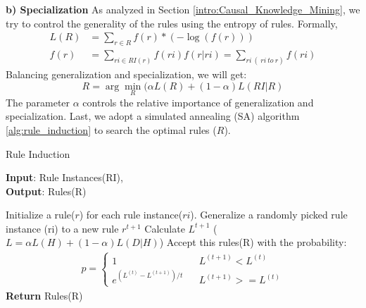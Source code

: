 \textbf{b) Specialization}
As analyzed in Section \ref{intro:Causal_Knowledge_Mining}, we try to control the generality of the rules using the entropy of rules. Formally,
\begin{equation*}
\begin{split}
L(R)&=\sum_{r \in R}{f(r)*(-\log(f(r)))}\\
f(r)&=\sum_{ri \in RI(r)}{f(ri)f(r|ri)}=\sum_{ri \ (\ ri\ to\ r)}f(ri)
\end{split}
\label{equ:mdl_2}
\end{equation*}
Balancing generalization and specialization, we will get:
$$R=\arg\min_{R}(\alpha L(R)+(1-\alpha)L(RI|R)\label{eq:objective_function}$$
The parameter $\alpha$ controls the relative importance of generalization and specialization.  
Last, we adopt a simulated annealing (SA) algorithm \ref{alg:rule_induction} to search the optimal rules ($R$). 
\begin{algorithm}[htb]
\caption{Rule Induction\label{alg:rule_induction}} 
\textbf{Input}: Rule Instances(RI), \zhpro \\
\textbf{Output}: Rules(R)
\begin{algorithmic}[1]
	\STATE Initialize a rule($r$) for each rule instance($ri$).
	\STATE	Generalize a randomly picked rule instance (ri) to a new rule $r^{t+1}$
	\STATE	Calculate $L^{t+1}$ ($L=\alpha L(H)+(1-\alpha)L(D|H)$)
	\STATE	Accept this rules(R) with the probability:
	\STATE	\begin{equation*}\begin{split}p=\left\{\begin{array}{rcl}1 & & {L^{(t+1)} < L^{(t)}}\\e^{(L^{(t)}-L^{(t+1)})/t}& &{L^{(t+1)}>= L^{(t)}}\end{array} \right.	\end{split}\end{equation*}
	\ENDWHILE
	\STATE \textbf{Return} Rules(R) 
\end{algorithmic}
\end{algorithm}	





